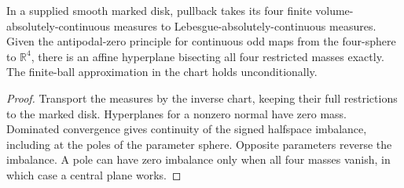 \begin{proposition}
\label{prop:ed03-marked-chart-division}
\leanok
In a supplied smooth marked disk, pullback takes its four finite
volume-absolutely-continuous measures to Lebesgue-absolutely-continuous
measures. Given the antipodal-zero principle for continuous odd maps
from the four-sphere to $\mathbb R^4$, there is an affine hyperplane
bisecting all four restricted masses exactly. The finite-ball
approximation in the chart holds unconditionally.
\end{proposition}
\begin{proof}
\leanok
Transport the measures by the inverse chart, keeping their full
restrictions to the marked disk. Hyperplanes for a nonzero normal have
zero mass. Dominated convergence gives continuity of the signed
halfspace imbalance, including at the poles of the parameter sphere.
Opposite parameters reverse the imbalance. A pole can have zero
imbalance only when all four masses vanish, in which case a central
plane works.
\end{proof}

